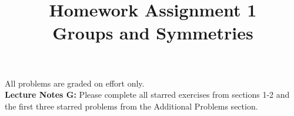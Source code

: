\documentclass[12pt]{article}
\begin{document}
\date{\vspace{-5ex}}

\title{Homework Assignment 1 \\ Groups and Symmetries}

\maketitle

\noindent
All problems are graded on effort only.\\

\noindent
{\bf Lecture Notes G:} Please complete all starred exercises from
sections 1-2 and the first three starred problems from the Additional
Problems section. \\
\end{document}
